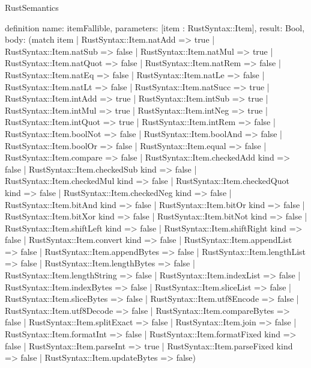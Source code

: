 \begin{lexlean}{RustSemantics}
\begin{semanticmodule}
definition{
  name: itemFallible,
  parameters: [item : RustSyntax::Item],
  result: Bool,
  body: (match item
    | RustSyntax::Item.natAdd => true
    | RustSyntax::Item.natSub => false
    | RustSyntax::Item.natMul => true
    | RustSyntax::Item.natQuot => false
    | RustSyntax::Item.natRem => false
    | RustSyntax::Item.natEq => false
    | RustSyntax::Item.natLe => false
    | RustSyntax::Item.natLt => false
    | RustSyntax::Item.natSucc => true
    | RustSyntax::Item.intAdd => true
    | RustSyntax::Item.intSub => true
    | RustSyntax::Item.intMul => true
    | RustSyntax::Item.intNeg => true
    | RustSyntax::Item.intQuot => true
    | RustSyntax::Item.intRem => false
    | RustSyntax::Item.boolNot => false
    | RustSyntax::Item.boolAnd => false
    | RustSyntax::Item.boolOr => false
    | RustSyntax::Item.equal => false
    | RustSyntax::Item.compare => false
    | RustSyntax::Item.checkedAdd kind => false
    | RustSyntax::Item.checkedSub kind => false
    | RustSyntax::Item.checkedMul kind => false
    | RustSyntax::Item.checkedQuot kind => false
    | RustSyntax::Item.checkedNeg kind => false
    | RustSyntax::Item.bitAnd kind => false
    | RustSyntax::Item.bitOr kind => false
    | RustSyntax::Item.bitXor kind => false
    | RustSyntax::Item.bitNot kind => false
    | RustSyntax::Item.shiftLeft kind => false
    | RustSyntax::Item.shiftRight kind => false
    | RustSyntax::Item.convert kind => false
    | RustSyntax::Item.appendList => false
    | RustSyntax::Item.appendBytes => false
    | RustSyntax::Item.lengthList => false
    | RustSyntax::Item.lengthBytes => false
    | RustSyntax::Item.lengthString => false
    | RustSyntax::Item.indexList => false
    | RustSyntax::Item.indexBytes => false
    | RustSyntax::Item.sliceList => false
    | RustSyntax::Item.sliceBytes => false
    | RustSyntax::Item.utf8Encode => false
    | RustSyntax::Item.utf8Decode => false
    | RustSyntax::Item.compareBytes => false
    | RustSyntax::Item.splitExact => false
    | RustSyntax::Item.join => false
    | RustSyntax::Item.formatInt => false
    | RustSyntax::Item.formatFixed kind => false
    | RustSyntax::Item.parseInt => true
    | RustSyntax::Item.parseFixed kind => false
    | RustSyntax::Item.updateBytes => false)
}


\end{semanticmodule}
\end{lexlean}
